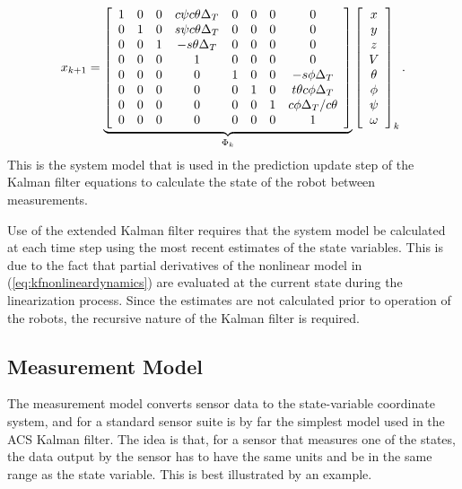 \begin{align}
\label{eq:kfSystemModelWithAssumptions}
x_{k+1} = 
\underbrace{\left[\begin{array}{c c c c c c c c}
1 & 0 & 0 & c\psi c\theta \Delta_T & 0 & 0 & 0 & 0 \\
0 & 1 & 0 & s\psi c\theta \Delta_T & 0 & 0 & 0 & 0\\
0 & 0 & 1 & -s\theta \Delta_T & 0 & 0 & 0 & 0\\
0 & 0 & 0 & 1 & 0 & 0 & 0 & 0 \\
0 & 0 & 0 & 0 & 1 & 0 & 0 & -s\phi \Delta_T \\
0 & 0 & 0 & 0 & 0 & 1 & 0 & t\theta c\phi \Delta_T \\
0 & 0 & 0 & 0 & 0 & 0 & 1 & c\phi \Delta_T/c\theta \\
0 & 0 & 0 & 0 & 0 & 0 & 0 & 1
\end{array}\right]}_{\Phi_k}
\left[\begin{array}{c}
x \\ y \\ z \\ V \\ \theta \\ \phi \\ \psi \\ \omega
\end{array}\right]_k.
\end{align}
This is the system model that is used in the prediction update step of the Kalman filter equations to calculate the state of the robot between measurements.

Use of the extended Kalman filter requires that the system model be calculated at each time step using the most recent estimates of the state variables. This is due to the fact that partial derivatives of the nonlinear model in (\ref{eq:kfnonlineardynamics}) are evaluated at the current state during the linearization process. Since the estimates are not calculated prior to operation of the robots, the recursive nature of the Kalman filter is required.

\subsection{Measurement Model}
\label{sec:kfMeasurementModel}
The measurement model converts sensor data to the state-variable coordinate system, and for a standard sensor suite is by far the simplest model used in the ACS Kalman filter. The idea is that, for a sensor that measures one of the states, the data output by the sensor has to have the same units and be in the same range as the state variable. This is best illustrated by an example.

